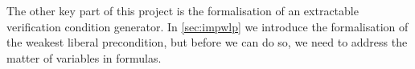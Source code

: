 The other key part of this project is the formalisation of an extractable verification condition generator.
In \ref{sec:impwlp} we introduce the formalisation of the weakest liberal precondition,
but before we can do so, we need to address the matter of variables in formulas.
